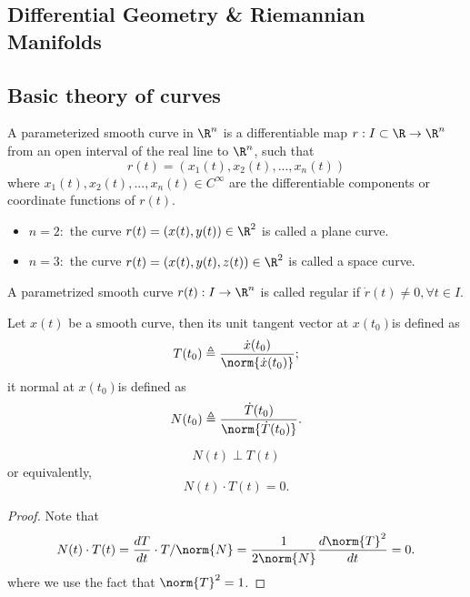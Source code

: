 
\begin{refsection}
\startcontents[chapters]	
\chapter{Differential Geometry \& Riemannian Manifolds}\label{ch:differential-geometry--riemannian-manifolds}


\section{Basic theory of curves}
\begin{definition}[curve]
A parameterized smooth curve in $\R^n$ is a differentiable map $r: I\subset \R \to \R^n$ from an open interval of the real line to $\R^n$, such that
$$r(t) = (x_1(t),x_2(t),...,x_n(t))$$
where $x_1(t),x_2(t),...,x_n(t) \in C^{\infty}$ are the differentiable components or coordinate functions of $r(t)$.
\end{definition}


\begin{example}\hfill
\begin{itemize}
    \item $n=2:$ the curve $r(t)=(x(t),y(t))\in \R^2$ is called a plane curve.
    \item $n=3:$ the curve $r(t)=(x(t),y(t),z(t))\in \R^2$ is called a space curve.
\end{itemize}
\end{example}


\begin{definition}[regularity]
A parametrized smooth curve $r(t): I\to \R^n$ is called regular if $\dot{r}(t) \neq 0,\forall t\in I$.
\end{definition}


\begin{definition}
	Let $x(t)$ be a smooth curve, then its unit tangent vector at $x(t_0)$is defined as
	$$T(t_0) \triangleq \frac{\dot{x}(t_0)}{\norm{\dot{x}(t_0)}};$$
	it normal at $x(t_0)$is defined as
	$$N(t_0) \triangleq \frac{\dot{T}(t_0)}{\norm{\dot{T}(t_0)}}.$$
\end{definition}

\begin{lemma}
	$$N(t)\perp T(t)$$
or equivalently,
	$$N(t)\cdot T(t) = 0.$$
\end{lemma}
\begin{proof}
Note that
$$N(t)\cdot T(t) = \frac{dT}{dt}\cdot T/\norm{N} = \frac{1}{2\norm{N}}\frac{d\norm{T}^2}{dt} = 0.$$
where we use the fact that $\norm{T}^2 = 1$.
\end{proof}


\end{refsection}
